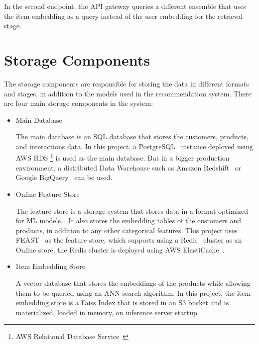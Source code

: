 In the second endpoint, the API gateway queries a different ensemble that uses the item embedding as a query instead of the user embedding for the retrieval stage.

\section{Storage Components}

The storage components are responsible for storing the data in different formats and stages, in addition to the models used in the recommendation system.
There are four main storage components in the system:

\begin{itemize}
    \item Main Database
    \begin{displayquote}
        The main database is an SQL database that stores the customers, products, and
         interactions data. In this project, a PostgreSQL~\cite{Postgres} instance 
         deployed using AWS RDS \footnote{AWS Relational Database Service~\cite{AwsRDS}}
         is used as the main database. 
         But in a bigger production environment, a distributed Data Warehouse such as 
         Amazon Redshift~\cite{AwsRedshift} or Google BigQuery~\cite{GoogleBigQuery} can be used.
    \end{displayquote}
    \item Online Feature Store
    \begin{displayquote}
        The feature store is a storage system that stores data in a format optimized for ML models.~\cite{NvidiaFeatureStores}
        It also stores the embedding tables of the customers 
        and products, in addition to any other categorical features.
        This project uses FEAST~\cite{feast} as the feature store, which supports using a Redis~\cite{Redis} 
        cluster as an Online store, the Redis cluster is deployed using AWS ElastiCache~\cite{AwsElastiCache}.
    \end{displayquote}

    \item Item Embedding Store
    \begin{displayquote}
        A vector database that stores the embeddings of the products
        while allowing them to be queried using an ANN search algorithm. 
        In this project, the item embedding store is a Faiss Index\cite{Faiss} that is stored in an S3 bucket and is materialized, loaded in memory, on inference server startup.
    \end{displayquote}


\end{itemize}
